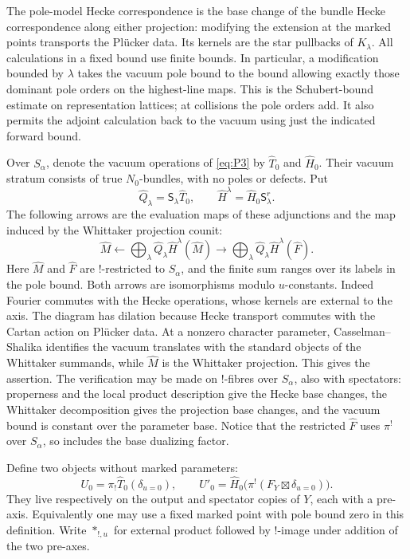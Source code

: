 \documentclass[11pt]{article}
\numberwithin{equation}{section}
\theoremstyle{definition}
\theoremstyle{remark}
\begin{document}
The pole-model Hecke correspondence is the base change of the bundle
Hecke correspondence along either projection: modifying the extension
at the marked points transports the Pl\"ucker data.  Its kernels are
the star pullbacks of $K_\lambda$.  All calculations in a fixed bound
use finite bounds.  In particular, a modification bounded by
$\lambda$ takes the vacuum pole bound to the bound allowing exactly
those dominant pole orders on the highest-line maps.  This is the
Schubert-bound estimate on representation lattices; at collisions
the pole orders add.  It also permits the adjoint calculation back
to the vacuum using just the indicated forward bound.

Over $S_\alpha$, denote the vacuum operations of \eqref{eq:P3} by
$\widehat T_0$ and $\widehat H_0$.  Their vacuum stratum consists of
true $N_0$-bundles, with no poles or defects.  Put
\[
 \widehat Q_\lambda=\mathsf S_\lambda\widehat T_0,
 \qquad
 \widehat H^\lambda=\widehat H_0\mathsf S_\lambda^r.
\]
The following arrows are the evaluation maps of these adjunctions and
the map induced by the Whittaker projection counit:
\begin{equation}
 \widehat M\longleftarrow
 \bigoplus_\lambda\widehat Q_\lambda
                    \widehat H^\lambda(\widehat M)
 \longrightarrow
 \bigoplus_\lambda\widehat Q_\lambda
                    \widehat H^\lambda(\widehat F).
 \label{eq:P8}
\end{equation}
Here $\widehat M$ and $\widehat F$ are $!$-restricted to $S_\alpha$,
and the finite sum ranges over its labels in the pole bound.  Both
arrows are isomorphisms modulo $u$-constants.  Indeed Fourier commutes
with the Hecke operations, whose kernels are external to the axis.
The diagram has dilation because Hecke transport commutes with the
Cartan action on Pl\"ucker data.  At a nonzero character parameter,
Casselman--Shalika identifies the vacuum translates with the standard
objects of the Whittaker summands, while $\widehat M$ is the Whittaker
projection.  This gives the assertion.  The verification may be made
on $!$-fibres over $S_\alpha$, also with spectators: properness and
the local product description give the Hecke base changes, the
Whittaker decomposition gives the projection base changes, and the
vacuum bound is constant over the parameter base.  Notice that the
restricted $\widehat F$ uses $\pi^!$ over $S_\alpha$, so includes the
base dualizing factor.

Define two objects without marked parameters:
\begin{equation}
 U_0=\pi_!\widehat T_0(\delta_{u=0}),\qquad
 U'_0=\widehat H_0
       \bigl(\pi^!(F_Y\boxtimes\delta_{u=0})\bigr).
 \label{eq:P9}
\end{equation}
They live respectively on the output and spectator copies of $Y$,
each with a pre-axis.  Equivalently one may use a fixed marked point
with pole bound zero in this definition.  Write $*_{!,u}$ for external
product followed by $!$-image under addition of the two pre-axes.
\end{document}
